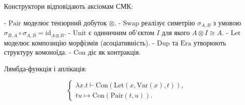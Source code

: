 \documentclass{article}
\theoremstyle{definition}
\begin{document}
Конструктори відповідають аксіомам СМК:

- $\mathrm{Pair}$ моделює тензорний добуток $\otimes$.
- $\mathrm{Swap}$ реалізує симетрію $\sigma_{A,B}$ з умовою $\sigma_{B,A} \circ \sigma_{A,B} = \mathrm{id}_{A \otimes B}$.
- $\mathrm{Unit}$ є одиничним об'єктом $I$ для якого $A \otimes I \cong A$.
- $\mathrm{Let}$ моделює композицію морфізмів (асоціативність).
- $\mathrm{Dup}$ та $\mathrm{Era}$ утворюють структуру комоноїда.
- $\mathrm{Con}$ діє як контракція.

Лямбда-функція і аплікація:

\[
\begin{cases}
  \lambda x.t \vdash \mathrm{Con}(\mathrm{Let}(x,\mathrm{Var}(x),t)), \\
  t u \mapsto \mathrm{Con}(\mathrm{Pair}(t,u)).
\end{cases}
\]
\end{document}
